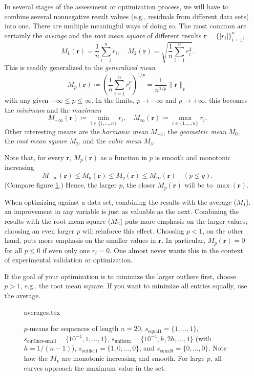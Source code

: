 \documentclass{scrartcl}
\theoremstyle{named}
\newcommand\rr{\ensuremath{\bm{r}}}
\begin{document}
In several stages of the assessment or optimization process, we will have to combine
several nonnegative result values (e.g., residuals from different data sets) into one.
There are multiple meaningful ways of doing so. The most common are certainly the
\emph{average} and the \emph{root mean square} of different results
$\rr = \{|r_i|\}_{i=1}^n$,
\[
  M_1(\rr) = \frac{1}{n}\sum_{i=1}^n r_i,\quad
  M_2(\rr) = \sqrt{\frac{1}{n}\sum_{i=1}^n r_i^2}.
\]
This is readily generalized to the
\emph{generalized mean}
\[
  M_p(\rr) \coloneqq \left(\frac{1}{n}\sum_{i=1}^n r_i^p\right)^{1/p} =
  \frac{1}{n^{1/p}} \|\rr\|_p
\]
with any given $-\infty \le p \le \infty$. In the limits, $p\to-\infty$ and
$p\to +\infty$, this becomes the \emph{minimum} and the \emph{maximum}
\[
  M_{-\infty}(\rr) \coloneqq \min_{i\in\{1,\dots,n\}} r_i, \quad
  M_{\infty}(\rr) \coloneqq \max_{i\in\{1,\dots,n\}} r_i.
\]
Other interesting means are the \emph{harmonic mean} $M_{-1}$, the \emph{geometric mean}
$M_0$, the \emph{root mean square} $M_2$, and the \emph{cubic mean} $M_3$.

Note that, for every $\rr$, $M_p(\rr)$ as a function in $p$ is smooth and monotonic
increasing
\[
  M_{-\infty}(\rr) \le M_p(\rr) \le M_q(\rr) \le M_{\infty}(\rr) \quad (p\le q).
\]
(Compare figure \ref{fig:1}.)
Hence, the larger $p$, the closer $M_p(\rr)$ will be to $\max(\rr)$.

When optimizing against a data set, combining the results with the average ($M_1$), an
improvement in any variable is just as valuable as the next. Combining the results with
the root mean square ($M_2$) puts more emphasis on the larger values; choosing an even
larger $p$ will reinforce this effect. Choosing $p < 1$, on the other hand, puts more
emphasis on the smaller values in $\rr$.  In particular, $M_p(\rr)=0$ for all $p\le 0$
if even only one $r_i=0$. One almost never wants this in the context of experimental
validation or optimization.

If the goal of your optimization is to minimize the larger outliers first, choose $p>1$,
e.g., the root mean square. If you want to minimize all entries equally, use the
average.

\begin{figure}
  \centering
  {averages.tex}
  \caption{$p$-means for sequences of length $n=20$, $s_\text{equal1} = \{1, \dots,
  1\}$, $s_\text{outliner-small} = \{10^{-4}, 1,\dots, 1\}$, $s_\text{uniform} =
  \{10^{-4}, h, 2h, \dots, 1\}$ (with $h = 1 / (n-1)$), $s_\text{outlier1} = \{1,
  0,\dots, 0\}$, and $s_\text{equal0} = \{0,\dots,0\}$. Note how the $M_p$ are monotonic
  increasing and smooth. For large $p$, all curves approach the maximum value in the
  set.}
  \label{fig:1}
\end{figure}
\end{document}
